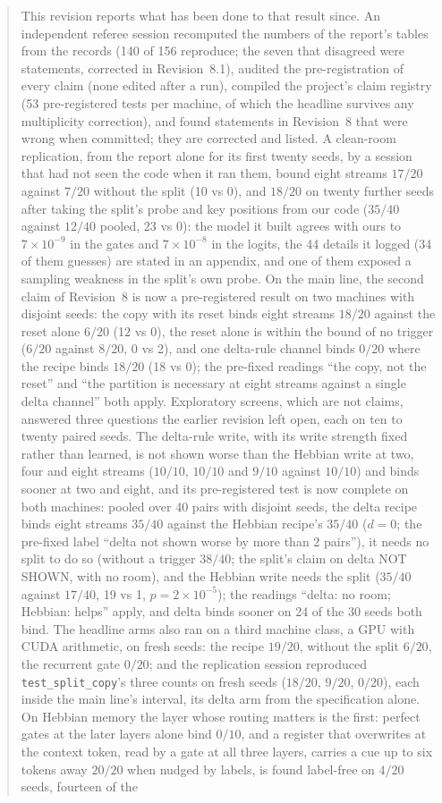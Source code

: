 \documentclass[11pt]{article}
\begin{document}
\begin{abstract}
This revision reports what has been done to that result since. An independent referee session recomputed the numbers of the report's tables from the records (140 of 156 reproduce; the seven that disagreed were statements, corrected in Revision~8.1), audited the pre-registration of every claim (none edited after a run), compiled the project's claim registry (53 pre-registered tests per machine, of which the headline survives any multiplicity correction), and found statements in Revision~8 that were wrong when committed; they are corrected and listed. A clean-room replication, from the report alone for its first twenty seeds, by a session that had not seen the code when it ran them, bound eight streams $17/20$ against $7/20$ without the split (10 vs 0), and $18/20$ on twenty further seeds after taking the split's probe and key positions from our code ($35/40$ against $12/40$ pooled, 23 vs 0): the model it built agrees with ours to $7\times10^{-9}$ in the gates and $7\times10^{-8}$ in the logits, the 44 details it logged (34 of them guesses) are stated in an appendix, and one of them exposed a sampling weakness in the split's own probe. On the main line, the second claim of Revision~8 is now a pre-registered result on two machines with disjoint seeds: the copy with its reset binds eight streams $18/20$ against the reset alone $6/20$ (12 vs 0), the reset alone is within the bound of no trigger ($6/20$ against $8/20$, 0 vs 2), and one delta-rule channel binds $0/20$ where the recipe binds $18/20$ (18 vs 0); the pre-fixed readings ``the copy, not the reset'' and ``the partition is necessary at eight streams against a single delta channel'' both apply. Exploratory screens, which are not claims, answered three questions the earlier revision left open, each on ten to twenty paired seeds. The delta-rule write, with its write strength fixed rather than learned, is not shown worse than the Hebbian write at two, four and eight streams ($10/10$, $10/10$ and $9/10$ against $10/10$) and binds sooner at two and eight, and its pre-registered test is now complete on both machines: pooled over 40 pairs with disjoint seeds, the delta recipe binds eight streams $35/40$ against the Hebbian recipe's $35/40$ ($d = 0$; the pre-fixed label ``delta not shown worse by more than 2 pairs''), it needs no split to do so (without a trigger $38/40$; the split's claim on delta NOT SHOWN, with no room), and the Hebbian write needs the split ($35/40$ against $17/40$, 19 vs 1, $p = 2\times10^{-5}$); the readings ``delta: no room; Hebbian: helps'' apply, and delta binds sooner on 24 of the 30 seeds both bind. The headline arms also ran on a third machine class, a GPU with CUDA arithmetic, on fresh seeds: the recipe $19/20$, without the split $6/20$, the recurrent gate $0/20$; and the replication session reproduced \texttt{test\_split\_copy}'s three counts on fresh seeds ($18/20$, $9/20$, $0/20$), each inside the main line's interval, its delta arm from the specification alone. On Hebbian memory the layer whose routing matters is the first: perfect gates at the later layers alone bind $0/10$, and a register that overwrites at the context token, read by a gate at all three layers, carries a cue up to six tokens away $20/20$ when nudged by labels, is found label-free on $4/20$ seeds, fourteen of the 
\end{abstract}
\end{document}
